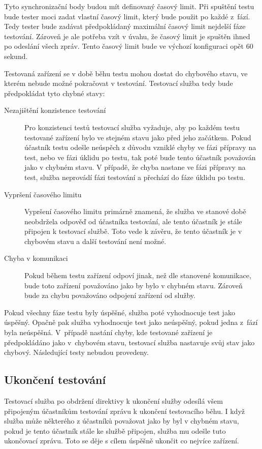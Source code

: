 Tyto synchronizační body budou mít definovaný časový limit. Při spuštění testu bude tester moci zadat vlastní časový limit, který bude použit po každé z~fází. Tedy tester bude zadávat předpokládaný maximální časový limit nejdelší fáze testování. Zároveň je ale potřeba vzít v úvahu, že časový limit je spuštěn ihned po odeslání všech zpráv. Tento časový limit bude ve výchozí konfiguraci opět 60 sekund. 

Testovaná zařízení se v době běhu testu mohou dostat do chybového stavu, ve kterém nebude možné pokračovat v testování. Testovací služba tedy bude předpokládat tyto chybné stavy:


\begin{description}
    \item[Nezajištění konzistence testování] Pro konzistenci testů testovací služba vyžaduje, aby po každém testu testované zařízení bylo ve stejném stavu jako před jeho začátkem. Pokud účastník testu odešle neúspěch z důvodu vzniklé chyby ve fázi přípravy na test, nebo ve fázi úklidu po testu, tak poté bude tento účastník považován jako v chybném stavu. V případě, že chyba nastane ve fázi přípravy na test, služba neprovádí fázi testování a přechází do fáze úklidu po testu. 
    \item[Vypršení časového limitu] Vypršení časového limitu primárně znamená, že služba ve stanové době neobdržela odpověď od účastníka testování, ale tento účastník je stále připojen k testovací službě. Toto vede k závěru, že tento účastník je v chybovém stavu a další testování není možné. 
    \item[Chyba v komunikaci] Pokud během testu zařízení odpoví jinak, než dle stanovené komunikace, bude toto zařízení považováno jako by bylo v chybném stavu. Zároveň bude za chybu považováno odpojení zařízení od služby.  
\end{description}

Pokud všechny fáze testu byly úspěšné, služba poté vyhodnocuje test jako úspěšný. Opačně pak služba vyhodnocuje test jako neúspěšný, pokud jedna z~fází byla neúspěšná. V~případě nastání chyby, kde testované zařízení je předpokládáno jako v~chybovém stavu, testovací služba nastavuje svůj stav jako chybový. Následující testy nebudou provedeny.


\subsection{Ukončení testování}
Testovací služba po obdržení direktivy k ukončení služby odesílá všem připojeným účastníkům testování zprávu k ukončení testovacího běhu. I když služba může některého z účastníků považovat jako by byl v chybném stavu, pokud je tento účastník stále ke službě připojen, služba mu odešle tuto ukončovací zprávu. Toto se děje s cílem úspěšně ukončit co nejvíce zařízení.


